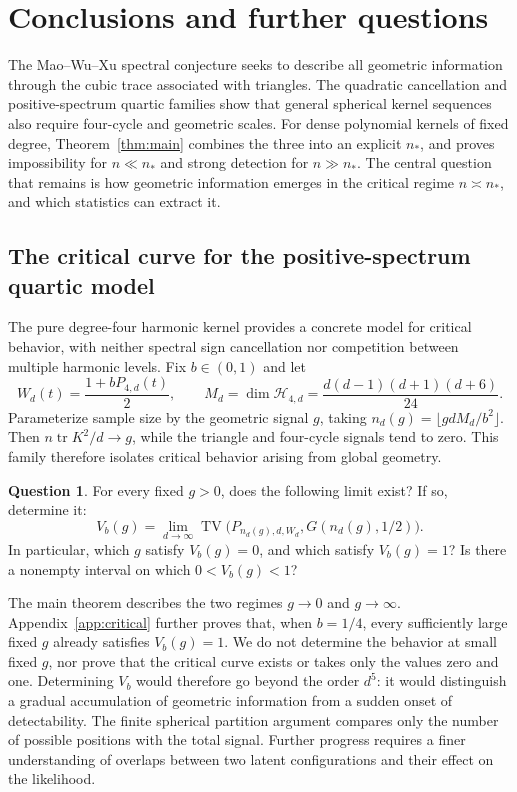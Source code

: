 \documentclass[11pt,reqno]{amsart}
\numberwithin{equation}{section}
\theoremstyle{definition}
\theoremstyle{remark}
\theoremstyle{definition}
\newtheorem{question}[theorem]{Question}
\DeclareMathOperator{\tr}{tr}
\DeclareMathOperator{\TV}{TV}
\begin{document}
\section{Conclusions and further questions}\label{sec:conclusion}
The Mao--Wu--Xu spectral conjecture seeks to describe all geometric information through the cubic trace associated with triangles.
The quadratic cancellation and positive-spectrum quartic families show that general spherical kernel sequences also require four-cycle and geometric scales.
For dense polynomial kernels of fixed degree, Theorem~\ref{thm:main} combines the three into an explicit $n_*$,
and proves impossibility for $n\ll n_*$ and strong detection for $n\gg n_*$.
The central question that remains is how geometric information emerges in the critical regime $n\asymp n_*$, and which statistics can extract it.

\subsection{The critical curve for the positive-spectrum quartic model}
The pure degree-four harmonic kernel provides a concrete model for critical behavior,
with neither spectral sign cancellation nor competition between multiple harmonic levels.
Fix $b\in(0,1)$ and let
\[
 W_d(t)=\frac{1+bP_{4,d}(t)}2,\qquad
 M_d=\dim\mathcal H_{4,d}=\frac{d(d-1)(d+1)(d+6)}{24}.
\]
Parameterize sample size by the geometric signal $g$, taking $n_d(g)=\lfloor gdM_d/b^2\rfloor$.
Then $n\tr K^2/d\to g$, while the triangle and four-cycle signals tend to zero.
This family therefore isolates critical behavior arising from global geometry.

\begin{question}\label{q:critical}
For every fixed $g>0$, does the following limit exist? If so, determine it:
\[
 V_b(g)=\lim_{d\to\infty}
 \TV\bigl(P_{n_d(g),d,W_d},G(n_d(g),1/2)\bigr).
\]
In particular, which $g$ satisfy $V_b(g)=0$, and which satisfy $V_b(g)=1$?
Is there a nonempty interval on which $0<V_b(g)<1$?
\end{question}

The main theorem describes the two regimes $g\to0$ and $g\to\infty$.
Appendix~\ref{app:critical} further proves that, when $b=1/4$, every sufficiently large fixed $g$ already satisfies
$V_b(g)=1$.
We do not determine the behavior at small fixed $g$, nor prove that the critical curve exists or takes only the values zero and one.
Determining $V_b$ would therefore go beyond the order $d^5$:
it would distinguish a gradual accumulation of geometric information from a sudden onset of detectability.
The finite spherical partition argument compares only the number of possible positions with the total signal.
Further progress requires a finer understanding of overlaps between two latent configurations and their effect on the likelihood.
\end{document}
